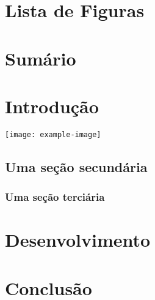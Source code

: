 \documentclass{abntexto-uece}
\begin{document}
\ImprimirPretextual
\nonum\notoc\section{Lista de Figuras}
\makelof
\nonum\notoc\section{Sumário}
\maketoc
\section{Introdução}
\lipsum[1]
\begin{place}
    \texttt{[image: example-image]}
\end{place}
\subsection{Uma seção secundária}
\subsubsection{Uma seção terciária}
\section{Desenvolvimento}
\section{Conclusão}
\end{document}
